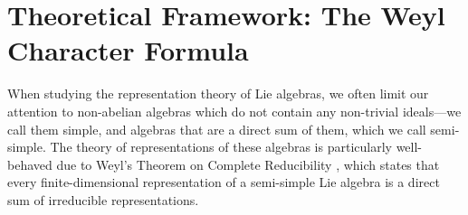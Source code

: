 \documentclass[11pt, a4paper]{article}
\DeclareMathOperator{\sgn}{sgn}
\theoremstyle{definition}
\theoremstyle{remark}
\begin{document}

\section{Theoretical Framework: The Weyl Character Formula}
\label{sec:wcf}

When studying the representation theory of Lie algebras, we often limit our attention to non-abelian algebras which do not contain any non-trivial ideals—we call them simple, and algebras that are a direct sum of them, which we call semi-simple. The theory of representations of these algebras is particularly well-behaved due to Weyl's Theorem on Complete Reducibility \cite{kirillovIntroductionLieGroups2017}, which states that every finite-dimensional representation of a semi-simple Lie algebra is a direct sum of irreducible representations.
\end{document}
